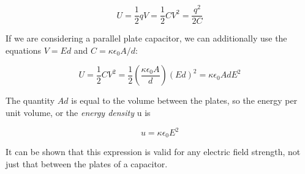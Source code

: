 \documentclass[12pt, a4paper]{article}
\theoremstyle{definition}
\begin{document}
\[U = \frac{1}{2}qV = \frac{1}{2}CV^2 = \frac{q^2}{2C}\]

If we are considering a parallel plate capacitor, we can additionally use the equations $V = Ed$ and $C = \kappa \epsilon_0 A/d$:

\[U = \frac{1}{2}CV^2 = \frac{1}{2}(\frac{\kappa \epsilon_0 A}{d})(Ed)^2 = \kappa \epsilon_0 AdE^2\]

The quantity $Ad$ is equal to the volume between the plates, so the energy per unit volume, or the \textit{energy density} u is

\[u = \kappa \epsilon_0 E^2\]

It can be shown that this expression is valid for any electric field strength, not just that between the plates of a capacitor.
\end{document}
